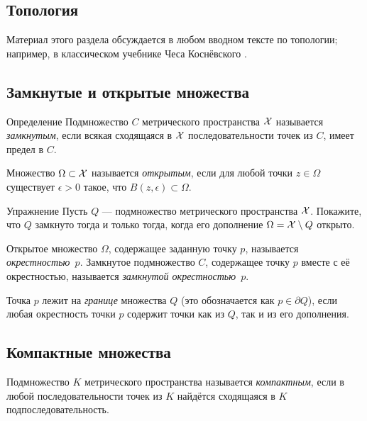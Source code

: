 \begin{multicols}{2}
{\section{Топология}\label{sec:topology}

Материал этого раздела обсуждается в любом вводном тексте по топологии;
например, в классическом учебнике Чеса Коснёвского \cite{kosniowski}.

\subsection*{Замкнутые и открытые множества}

\begin{thm}{Определение}
Подмножество $C$ метрического пространства $\mathcal{X}$ называется \emph{замкнутым}, если всякая сходящаяся в $\mathcal{X}$ последовательности точек из $C$, имеет предел в $C$.

Множество $\Omega \subset \mathcal{X}$ называется \emph{открытым}, если для любой точки $z\in \Omega$ 
существует $\epsilon>0$ такое, что $B(z,\epsilon)\subset\Omega$.
\end{thm}

\begin{thm}{Упражнение}\label{ex:close-open}
Пусть $Q$ --- подмножество метрического пространства $\mathcal{X}$.
Покажите, что $Q$ замкнуто тогда и только тогда, когда его дополнение $\Omega=\mathcal{X}\setminus Q$ открыто.
\end{thm}

Открытое множество $\Omega$, содержащее заданную точку $p$, называется \emph{окрестностью~$p$}.
Замкнутое подмножество $C$, содержащее точку $p$ вместе с её окрестностью, называется \emph{замкнутой окрестностью~$p$}.

Точка $p$ лежит на \emph{границе} множества $Q$ (это обозначается как $p\in\partial Q$), если любая окрестность точки $p$ содержит точки как из $Q$, так и из его дополнения.

\subsection*{Компактные множества}

{\sloppy
Подмножество $K$ метрического пространства называется \emph{компактным}, если в любой последовательности точек из $K$ найдётся сходящаяся в $K$ подпоследовательность.

}

}
\end{multicols}
